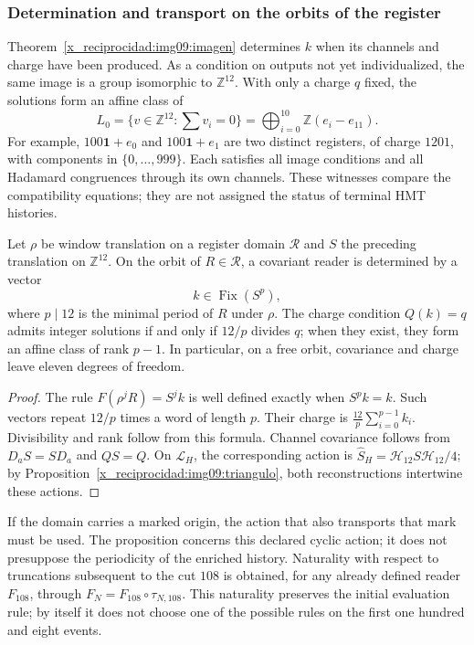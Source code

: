 \subsubsection{Determination and transport on the orbits of the register}

Theorem~\ref{x_reciprocidad:img09:imagen} determines $k$ when its channels and charge have been produced. As a condition on outputs not yet individualized, the same image is a group isomorphic to $\mathbb Z^{12}$. With only a charge $q$ fixed, the solutions form an affine class of
\[
 L_0=\{v\in\mathbb Z^{12}:\sum v_i=0\}
 =\bigoplus_{i=0}^{10}\mathbb Z(e_i-e_{11}).
\]
For example, $100\mathbf1+e_0$ and $100\mathbf1+e_1$ are two distinct registers, of charge $1201$, with components in $\{0,\ldots,999\}$. Each satisfies all image conditions and all Hadamard congruences through its own channels. These witnesses compare the compatibility equations; they are not assigned the status of terminal HMT histories.

\begin{proposition}
\label{x_reciprocidad:img09:covariancia}
Let $\rho$ be window translation on a register domain $\mathscr R$ and $S$ the preceding translation on $\mathbb Z^{12}$. On the orbit of $R\in\mathscr R$, a covariant reader is determined by a vector
\[
 k\in\operatorname{Fix}(S^p),
\]
where $p\mid12$ is the minimal period of $R$ under $\rho$. The charge condition $Q(k)=q$ admits integer solutions if and only if $12/p$ divides $q$; when they exist, they form an affine class of rank $p-1$. In particular, on a free orbit, covariance and charge leave eleven degrees of freedom.
\end{proposition}
\begin{proof}
The rule $F(\rho^jR)=S^jk$ is well defined exactly when
$S^pk=k$. Such vectors repeat $12/p$ times a word of
length $p$. Their charge is $\frac{12}{p}\sum_{i=0}^{p-1}k_i$.
Divisibility and rank follow from this formula. Channel
covariance follows from $D_aS=SD_a$ and $QS=Q$.
On $\mathcal L_H$, the corresponding action is
$\widehat S_H=\mathcal H_{12}S\mathcal H_{12}/4$;
by Proposition~\ref{x_reciprocidad:img09:triangulo}, both reconstructions
intertwine these actions.
\end{proof}

If the domain carries a marked origin, the action that also transports that mark must be used. The proposition concerns this declared cyclic action; it does not presuppose the periodicity of the enriched history. Naturality with respect to truncations subsequent to the cut $108$ is obtained, for any already defined reader $F_{108}$, through $F_N=F_{108}\circ\tau_{N,108}$. This naturality preserves the initial evaluation rule; by itself it does not choose one of the possible rules on the first one hundred and eight events.

